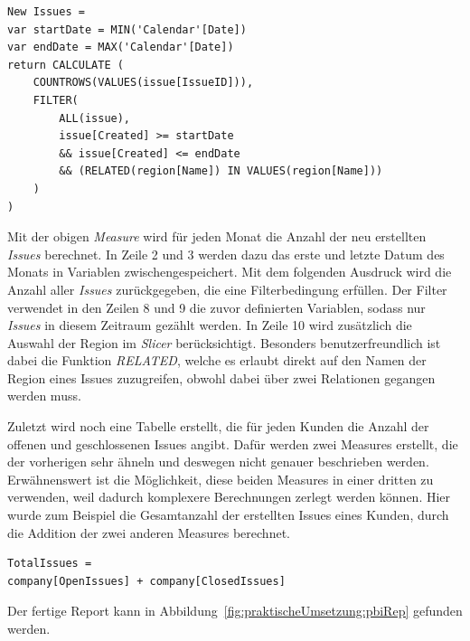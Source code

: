 \begin{minipage}{\linewidth}
\begin{lstlisting}[caption=Measure: Anzahl neuer \textit{Issues} in einem Zeitabschnitt,captionpos=b]
New Issues = 
var startDate = MIN('Calendar'[Date])
var endDate = MAX('Calendar'[Date])
return CALCULATE (
    COUNTROWS(VALUES(issue[IssueID])), 
    FILTER(
        ALL(issue),
        issue[Created] >= startDate 
        && issue[Created] <= endDate 
        && (RELATED(region[Name]) IN VALUES(region[Name]))
    )
)
\end{lstlisting}
\end{minipage}

\noindent Mit der obigen \textit{Measure} wird für jeden Monat die Anzahl der neu erstellten \textit{Issues} berechnet. In Zeile 2 und 3 werden dazu das erste und letzte Datum des Monats in Variablen zwischengespeichert. Mit dem folgenden Ausdruck wird die Anzahl aller \textit{Issues} zurückgegeben, die eine Filterbedingung erfüllen. Der Filter verwendet in den Zeilen 8 und 9 die zuvor definierten Variablen, sodass nur \textit{Issues} in diesem Zeitraum gezählt werden. In Zeile 10 wird zusätzlich die Auswahl der Region im \textit{Slicer} berücksichtigt. Besonders benutzerfreundlich ist dabei die Funktion \textit{RELATED}, welche es erlaubt direkt auf den Namen der Region eines Issues zuzugreifen, obwohl dabei über zwei Relationen gegangen werden muss. 

Zuletzt wird noch eine Tabelle erstellt, die für jeden Kunden die Anzahl der offenen und geschlossenen Issues angibt. Dafür werden zwei Measures erstellt, die der vorherigen sehr ähneln und deswegen nicht genauer beschrieben werden. Erwähnenswert ist die Möglichkeit, diese beiden Measures in einer dritten zu verwenden, weil dadurch komplexere Berechnungen zerlegt werden können. Hier wurde zum Beispiel die Gesamtanzahl der erstellten Issues eines Kunden, durch die Addition der zwei anderen Measures berechnet.

\begin{minipage}{\linewidth}
\begin{lstlisting}[captionpos=b, caption={[Verwendung von Measures in Measure]Verwendung von Measures in Measure. Die Verwendung einer Measure unterscheidet sich nicht von einer normalen Spalte.}]
TotalIssues = 
company[OpenIssues] + company[ClosedIssues]
\end{lstlisting}
\end{minipage}

\noindent Der fertige Report kann in Abbildung~\ref{fig:praktischeUmsetzung:pbiRep} gefunden werden.

